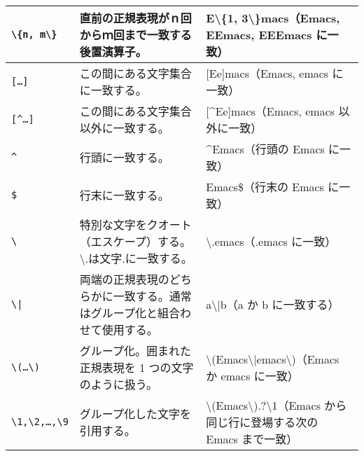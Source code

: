 \begin{longtable}{lp{}p{}}
  \texttt{\textbackslash\{n, m\textbackslash\}}                         & 直前の正規表現がｎ回からｍ回まで一致する後置演算子。                           & E\textbackslash\{1, 3\textbackslash\}macs（Emacs, EEmacs, EEEmacs に一致）                                                     \\ \midrule
  \texttt{[\hphantom{.}\ldots\hphantom{\^{}}]}                          & この間にある文字集合に一致する。                                               & [Ee]macs（Emacs, emacs に一致）                                                                                                \\ \midrule
  \texttt{[\^{}\ldots\hphantom{\^{}}]}                                  & この間にある文字集合以外に一致する。                                           & [\^{}Ee]macs（Emacs, emacs 以外に一致）                                                                                        \\ \midrule
  \texttt{\^{}}                                                         & 行頭に一致する。                                                               & \^{}Emacs（行頭の Emacs に一致）                                                                                               \\ \midrule
  \texttt{\$}                                                           & 行末に一致する。                                                               & Emacs\$（行末の Emacs に一致）                                                                                                 \\ \midrule
  \texttt{\textbackslash}                                               & 特別な文字をクオート（エスケープ）する。\textbackslash{}.は文字{.}に一致する。 & \textbackslash{}.emacs（.emacs に一致）                                                                                        \\ \midrule
  \texttt{\textbackslash{}|}                                            & 両端の正規表現のどちらかに一致する。通常はグループ化と組合わせて使用する。     & a\textbackslash|{}b（a か b に一致する）                                                                                       \\ \midrule
  \texttt{\textbackslash(\hphantom{.}\ldots\hphantom{.}\textbackslash)} & グループ化。囲まれた正規表現を 1 つの文字のように扱う。                        & \textbackslash{}(Emacs\textbackslash{}|emacs\textbackslash)（Emacs か emacs に一致）                                           \\ \midrule
  \texttt{\textbackslash{}1,\textbackslash{}2,\ldots,\textbackslash{}9} & グループ化した文字を引用する。                                                 & \textbackslash(Emacs\textbackslash).\textasteriskcentered{}?\textbackslash{}1（Emacs から同じ行に登場する次の Emacs まで一致） \\ \bottomrule
\end{longtable}
